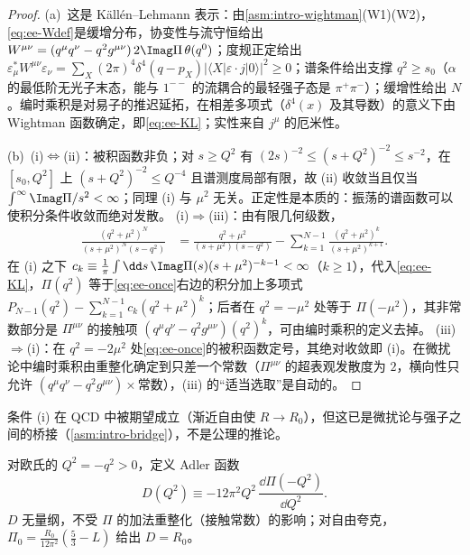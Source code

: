 \begin{proof}
(a)~这是 Källén--Lehmann 表示：由\cref{asm:intro-wightman}(W1)(W2)，\cref{eq:ee-Wdef}是缓增分布，协变性与流守恒给出 $W^{\mu\nu}=(q^\mu q^\nu-q^2g^{\mu\nu})\,2\Imag\Pi\,\theta(q^0)$；度规正定给出 $\varepsilon^*_\mu W^{\mu\nu}\varepsilon_\nu=\sum_X(2\pi)^4\delta^4(q-p_X)|\langle X|\varepsilon\cdot j|0\rangle|^2\ge0$；谱条件给出支撑 $q^2\ge s_0$（$\alpha$ 的最低阶无光子末态，能与 $1^{--}$ 的流耦合的最轻强子态是 $\pi^+\pi^-$）；缓增性给出 $N$。编时乘积是对易子的推迟延拓，在相差多项式（$\delta^4(x)$ 及其导数）的意义下由 Wightman 函数确定，即\cref{eq:ee-KL}；实性来自 $j^\mu$ 的厄米性。

(b)~(i)$\Leftrightarrow$(ii)：被积函数非负；对 $s\ge Q^2$ 有 $(2s)^{-2}\le(s+Q^2)^{-2}\le s^{-2}$，在 $[s_0,Q^2]$ 上 $(s+Q^2)^{-2}\le Q^{-4}$ 且谱测度局部有限，故 (ii) 收敛当且仅当 $\int^\infty\Imag\Pi/s^2<\infty$；同理 (i) 与 $\mu^2$ 无关。正定性是本质的：振荡的谱函数可以使积分条件收敛而绝对发散。
(i)$\Rightarrow$(iii)：由有限几何级数，
\begin{equation}\label{eq:ee-geom}
\begin{split}
\frac{(q^2+\mu^2)^N}{(s+\mu^2)^N(s-q^2)}&=\frac{q^2+\mu^2}{(s+\mu^2)(s-q^2)}-\sum_{k=1}^{N-1}\frac{(q^2+\mu^2)^k}{(s+\mu^2)^{k+1}} .
\end{split}
\end{equation}
在 (i) 之下 $c_k\equiv\frac1\pi\int\dd s\,\Imag\Pi(s)(s+\mu^2)^{-k-1}<\infty$（$k\ge1$），代入\cref{eq:ee-KL}，$\Pi(q^2)$ 等于\cref{eq:ee-once}右边的积分加上多项式 $P_{N-1}(q^2)-\sum_{k=1}^{N-1}c_k(q^2+\mu^2)^k$；后者在 $q^2=-\mu^2$ 处等于 $\Pi(-\mu^2)$，其非常数部分是 $\Pi^{\mu\nu}$ 的接触项 $(q^\mu q^\nu-q^2g^{\mu\nu})(q^2)^k$，可由编时乘积的定义去掉。
(iii)$\Rightarrow$(i)：在 $q^2=-2\mu^2$ 处\cref{eq:ee-once}的被积函数定号，其绝对收敛即 (i)。在微扰论中编时乘积由重整化确定到只差一个常数（$\Pi^{\mu\nu}$ 的超表观发散度为 $2$，横向性只允许 $(q^\mu q^\nu-q^2g^{\mu\nu})\times$常数），(iii) 的“适当选取”是自动的。
\end{proof}
条件 (i) 在 QCD 中被期望成立（渐近自由使 $R\to R_0$），但这已是微扰论与强子之间的桥接（\cref{asm:intro-bridge}），不是公理的推论。

\begin{definition}[Adler 函数]\label{def:ee-adler}
对欧氏的 $Q^2=-q^2>0$，定义 Adler 函数\cite{Adler1974}
\[
D(Q^2)\equiv-12\pi^2Q^2\,\frac{\dd\Pi(-Q^2)}{\dd Q^2}.
\]
$D$ 无量纲，不受 $\Pi$ 的加法重整化（接触常数）的影响；对自由夸克，$\Pi_0=\frac{R_0}{12\pi^2}(\frac53-L)$ 给出 $D=R_0$。
\end{definition}

